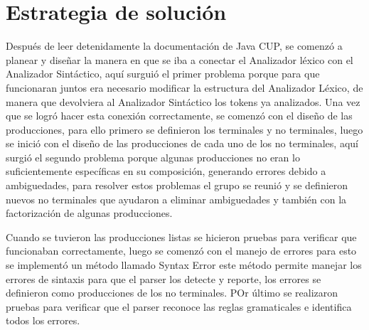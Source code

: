 \documentclass[a4paper,12pt]{article}
\begin{document}
\section*{Estrategia de solución}
\begin{flushleft}
    \hspace*{2em} Después de leer detenidamente la documentación 
    de Java CUP, se comenzó a planear y diseñar la manera en que se iba a conectar el Analizador léxico con el Analizador Sintáctico, 
    aquí surguió el primer problema porque para que funcionaran juntos era necesario modificar la estructura del Analizador Léxico, 
    de manera que devolviera al Analizador Sintáctico los tokens ya analizados. Una vez que se logró hacer esta conexión correctamente, 
    se comenzó con el diseño de las producciones, para ello primero se definieron los terminales y no terminales, luego se inició con el diseño de las 
    producciones de cada uno de los no terminales, aquí surgió el segundo problema porque algunas producciones no eran lo suficientemente 
    específicas en su composición, generando errores debido a ambiguedades, para resolver estos problemas el grupo se reunió y se definieron 
    nuevos no terminales que ayudaron a eliminar ambiguedades y también con la factorización de algunas producciones. \par
   \vspace{1em}
    \hspace*{2em} Cuando se tuvieron las producciones listas se hicieron pruebas para verificar que funcionaban correctamente, 
    luego se comenzó con el manejo de errores para esto se implementó un método llamado Syntax Error este método permite 
    manejar los errores de sintaxis para que el parser los detecte y reporte, los errores se definieron como producciones de los 
   no terminales. POr último se realizaron pruebas para verificar que el parser reconoce las reglas gramaticales e identifica todos los errores. \par
    \vspace{1em}
\end{flushleft}

\newpage

\end{document}
